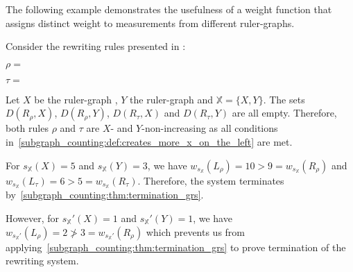 The following example demonstrates the usefulness of a weight function that assigns distinct weight to measurements from different ruler-graphs.
\begin{example} 
    \label{ex:overbeek_5d6}
    Consider the rewriting rules presented in \cite[Example 5.6]{overbeek2024termination_lmcs}:
    \begin{center} 
      $\rho = $\scalebox{0.7}{}
    \end{center}
    \begin{center}
    $\tau = $\scalebox{0.7}{
    }
    \end{center}
     Let $X$ be the ruler-graph
    , $Y$ the ruler-graph
     and $\mathbb{X} = \{X, Y\}$.
    The sets $D(R_\rho, X)$, $D(R_\rho, Y)$, $D(R_\tau, X)$ and $D(R_\tau, Y)$ are all empty. Therefore, both rules $\rho$ and $\tau$ are $X$- and $Y$-non-increasing as all conditions in~\autoref{subgraph_counting:def:creates_more_x_on_the_left} are met.
    
    For $s_\mathbb{X}(X) = 5$ and $s_\mathbb{X}(Y) = 3$, we have $
    w_{s_\mathbb{X}}(L_\rho) = 10 > 9 = w_{s_\mathbb{X}}(R_\rho)
    $ and $
    w_{s_\mathbb{X}}(L_\tau) = 6 > 5 = w_{s_\mathbb{X}}(R_\tau)$.
    Therefore, the system terminates by~\autoref{subgraph_counting:thm:termination_grs}.

  However, for $s_\mathbb{X}'(X) = 1$ and $s_\mathbb{X}'(Y) = 1$, we have
    \(
        w_{s_\mathbb{X}'}(L_\rho) = 2 \not > 3 = w_{s_\mathbb{X}'}(R_\rho)
    \) which prevents us from applying~\autoref{subgraph_counting:thm:termination_grs} to prove termination of the rewriting system.
    
\end{example}

 

